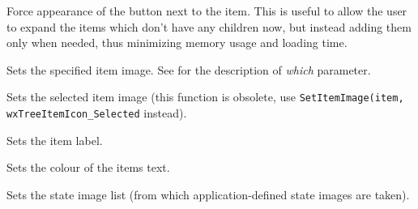 
\label{wxtreectrlsetitemhaschildren}


Force appearance of the button next to the item. This is useful to
allow the user to expand the items which don't have any children now,
but instead adding them only when needed, thus minimizing memory
usage and loading time.

\label{wxtreectrlsetitemimage}


Sets the specified item image. See 
for the description of {\it which} parameter.

\label{wxtreectrlsetitemselectedimage}


Sets the selected item image (this function is obsolete, use
{\tt SetItemImage(item, wxTreeItemIcon\_Selected} instead).

\label{wxtreectrlsetitemtext}


Sets the item label.

\label{wxtreectrlsetitemtextcolour}


Sets the colour of the items text.

\label{wxtreectrlsetstateimagelist}


Sets the state image list (from which application-defined state images are taken).

\label{wxtreectrlsortchildren}

